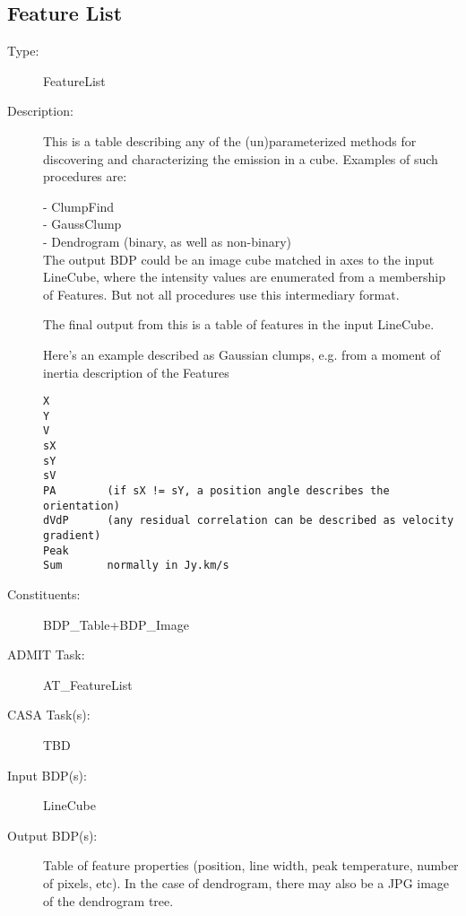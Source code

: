 \subsection{Feature List}
\begin{description}
\item[Type:] FeatureList
\item[Description:]

This is a table describing any of the (un)parameterized methods for
discovering and characterizing the emission in a cube.  Examples of
such procedures are:

- ClumpFind \\
- GaussClump \\
- Dendrogram (binary, as well as non-binary) \\

The output BDP could be an image cube matched in axes to the input LineCube,
where the intensity values are enumerated from a membership of Features. But
not all procedures use this intermediary format.

The final output from this is a table of features in the input LineCube.

Here's an example described as Gaussian clumps, e.g. from a moment
of inertia description of the Features
\begin{verbatim}
X
Y
V
sX
sY
sV
PA        (if sX != sY, a position angle describes the orientation)
dVdP      (any residual correlation can be described as velocity gradient)
Peak      
Sum       normally in Jy.km/s
\end{verbatim}

\item[Constituents:] BDP\_Table+BDP\_Image

\item[ADMIT Task:] AT\_FeatureList

\item[CASA Task(s):] TBD

\item[Input BDP(s):] LineCube

\item[Output BDP(s):]  Table of feature properties (position, line width,
 peak temperature, number of pixels, etc).  In the case of dendrogram,
 there may also be a JPG image of the dendrogram tree.
\end{description}
